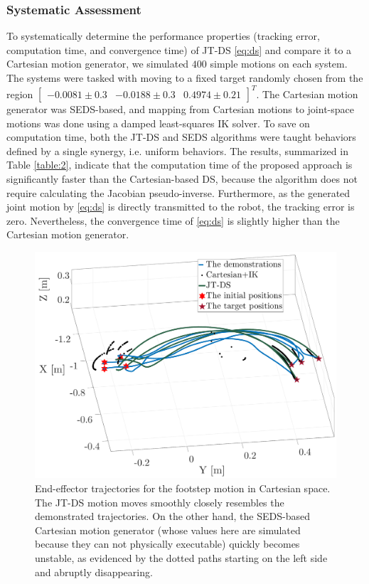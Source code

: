 \documentclass[letterpaper, 10 pt, conference,fleqn]{ieeeconf}
\begin{document}
\subsubsection{Systematic Assessment}
To systematically determine the performance properties (tracking error, computation time, and convergence time) of JT-DS \eqref{eq:ds} and compare it to a Cartesian motion generator, we simulated $400$ simple motions on each system. The systems were tasked with moving to a fixed target randomly chosen from the region $\begin{bmatrix} -0.0081\pm0.3&-0.0188\pm0.3&0.4974\pm0.21 \end{bmatrix}^T$. The Cartesian motion generator was SEDS-based, and mapping from Cartesian motions to joint-space motions was done using a damped least-squares IK solver. To save on computation time, both the JT-DS and SEDS algorithms were taught behaviors defined by a single synergy, i.e. uniform behaviors.  The results, summarized in Table \ref{table:2}, indicate that the computation time of the proposed approach is significantly faster than the Cartesian-based DS, because the algorithm does not require calculating the Jacobian pseudo-inverse. Furthermore, as the generated joint motion by \eqref{eq:ds} is directly transmitted to the robot, the tracking error is zero. Nevertheless, the convergence time of  \eqref{eq:ds} is slightly higher than the Cartesian motion generator.


\begin{figure}[t]
\vspace{-5pt}
	\centering
	\includegraphics[width=0.8\linewidth]{Pic/Foot.pdf}
	\caption{End-effector trajectories for the footstep motion in Cartesian space. The JT-DS motion moves smoothly closely resembles the demonstrated trajectories. On the other hand, the SEDS-based Cartesian motion generator (whose values here are simulated because they can not physically executable) quickly becomes unstable, as evidenced by the dotted paths starting on the left side and abruptly disappearing. \label{fig:foot}}
\end{figure}
\end{document}
